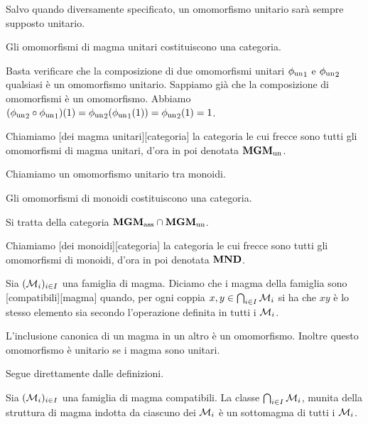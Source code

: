 \par Salvo quando diversamente specificato, un omomorfismo unitario sar\`a sempre supposto unitario.
\begin{Theorem}
	Gli omomorfismi di magma unitari costituiscono una categoria.
\end{Theorem}
\Proof Basta verificare che la composizione di due omomorfismi unitari ${\phi_{\text{un}}}_1$ e ${\phi_{\text{un}}}_2$ qualsiasi \`e un omomorfismo unitario. Sappiamo gi\`a che la composizione di omomorfismi \`e un omomorfismo. Abbiamo $({\phi_{\text{un}}}_2 \circ {\phi_{\text{un}}}_1)(1) = {\phi_{\text{un}}}_2({\phi_{\text{un}}}_1(1)) = {\phi_{\text{un}}}_2(1) = 1$. \EndProof
\begin{Definition}
	Chiamiamo [dei magma unitari][categoria] la categoria le cui frecce sono tutti gli omomorfismi di magma unitari, d'ora in poi denotata $\mathbf{MGM}_{\text{un}}$.
\end{Definition}
\begin{Definition}
	Chiamiamo  un omomorfismo unitario tra monoidi.
\end{Definition}
\begin{Theorem}
	Gli omomorfismi di monoidi costituiscono una categoria.
\end{Theorem}
\Proof Si tratta della categoria $\mathbf{MGM}_{\text{ass}} \cap \mathbf{MGM}_{\text{un}}$. \EndProof
\begin{Definition}
	Chiamiamo [dei monoidi][categoria] la categoria le cui frecce sono tutti gli omomorfismi di monoidi, d'ora in poi denotata $\mathbf{MND}$.
\end{Definition}
\begin{Definition}
	Sia $(\mathcal{M}_i)_{i \in I}$ una famiglia di magma. Diciamo che i magma della famiglia sono [compatibili][magma] quando, per ogni coppia $x, y \in \bigcap_{i \in I} \mathcal{M}_i$ si ha che $xy$ \`e lo stesso elemento sia secondo l'operazione definita in tutti i $\mathcal{M}_i$.
\end{Definition}
\begin{Theorem}
	L'inclusione canonica di un magma in un altro \`e un omomorfismo. Inoltre questo omomorfismo \`e unitario se i magma sono unitari.
\end{Theorem}
\Proof Segue direttamente dalle definizioni. \EndProof
\begin{Theorem}
	Sia $(\mathcal{M}_i)_{i \in I}$ una famiglia di magma compatibili. La classe $\bigcap_{i \in I} \mathcal{M}_i$, munita della struttura di magma indotta da ciascuno dei $\mathcal{M}_i$ \`e un sottomagma di tutti i $\mathcal{M}_i$.
\end{Theorem}
